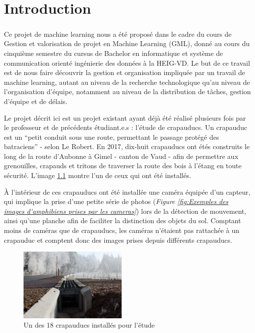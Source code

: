 \chapter{Introduction}
\paragraph*{}
Ce projet de machine learning nous a été proposé dans le cadre du cours de Gestion et valorisation de projet en Machine Learning (GML), donné au cours du cinquième semestre du cursus de Bachelor en informatique et système de communication orienté ingénierie des données à la HEIG-VD. Le but de ce travail est de nous faire découvrir la gestion et organisation impliquée par un travail de machine learning, autant au niveau de la recherche technologique qu'au niveau de l'organisation d'équipe, notamment au niveau de la distribution de tâches, gestion d'équipe et de délais. \newline

Le projet décrit ici est un projet existant ayant déjà été réalisé plusieurs fois par le professeur et de précédents étudiant.e.s : l'étude de crapauducs. Un crapauduc est un “petit conduit sous une route, permettant le passage protégé des batraciens” - selon Le Robert. En 2017, dix-huit crapauducs ont étés construits le long de la route d'Aubonne à Gimel - canton de Vaud - afin de permettre aux grenouilles, crapauds et tritons de traverser la route des bois à l'étang en toute sécurité. L'image \ref{fig:Un des 18 crapauducs installés pour l'étude} montre l'un de ceux qui ont été installés. \newline

À l'intérieur de ces crapauducs ont été installée une caméra équipée d'un capteur, qui implique la prise d'une petite série de photos (\textit{Figure \ref{fig:Exemples des images d'amphibiens prises par les cameras}}) lors de la détection de mouvement, ainsi qu'une planche afin de faciliter la distinction des objets du sol. Comptant moins de caméras que de crapauducs, les caméras n'étaient pas rattachée à un crapauduc et comptent donc des images prises depuis différents crapauducs.\newline

\begin{figure}[!htb]
    \centering
    \includegraphics[width=200px]{images/introduction_crapauduc_exterieur.png}
    \caption{Un des 18 crapauducs installés pour l'étude}
    \label{fig:Un des 18 crapauducs installés pour l'étude}
\end{figure}


